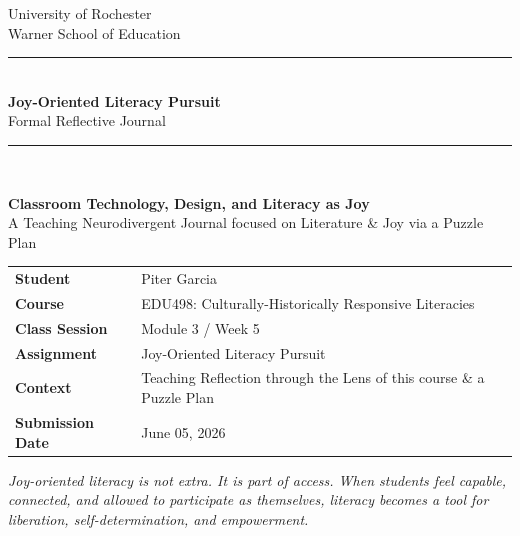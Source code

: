 \documentclass[11pt]{article}
\begin{document}
\begin{titlepage}
\thispagestyle{empty}

\begin{center}
    \vspace*{0.25in}
    {\large University of Rochester\\}
    {\normalsize Warner School of Education\\[0.35in]}

    {\color{PrimaryRed}\rule{\textwidth}{1.4pt}}\\[0.22in]
    {\Huge\bfseries Joy-Oriented Literacy Pursuit\\[0.12in]}
    {\Large Formal Reflective Journal\\[0.22in]}
    {\color{PrimaryRed}\rule{0.72\textwidth}{0.7pt}}\\[0.32in]

    \colorbox{SoftBlue}{%
        \parbox{0.86\textwidth}{%
            \centering\vspace{0.12in}
            \textbf{Classroom Technology, Design, and Literacy as Joy}\\[0.05in]
            A Teaching Neurodivergent Journal focused on Literature \& Joy via a Puzzle Plan
            \vspace{0.12in}
        }%
    }
\end{center}

\vspace{0.75in}

\begin{center}
\renewcommand{\arraystretch}{1.35}
\begin{tabular}{>{\bfseries\RaggedLeft}p{1.55in} p{4.85in}}
Student & Piter Garcia \\
Course & EDU498: Culturally-Historically Responsive Literacies \\
Class Session & Module 3 / Week 5 \\
Assignment & Joy-Oriented Literacy Pursuit \\
Context & Teaching Reflection through the Lens of this course \& a Puzzle Plan\\
Submission Date & June 05, 2026 \\
\end{tabular}
\end{center}

\vfill

\begin{center}
\begin{minipage}{0.78\textwidth}
\centering
\itshape
Joy-oriented literacy is not extra. It is part of access. When students feel capable, connected, and allowed to participate as themselves, literacy becomes a tool for liberation, self-determination, and empowerment.
\end{minipage}
\end{center}

\restoregeometry
\end{titlepage}
\clearpage
\end{document}
